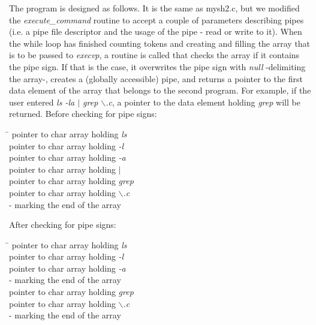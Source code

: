 \documentclass[a4paper,10pt]{article}
\begin{document}
The program is designed as follows. It is the same as mysh2.c, but we modified the \emph{execute\_command} routine to accept a couple of parameters describing pipes (i.e. a pipe file descriptor and the usage of the pipe - read or write to it). When the while loop has finished counting tokens and creating and filling the array that is to be passed to \emph{execvp}, a routine is called that checks the array if it contains the pipe sign. If that is the case, it overwrites the pipe sign with \emph{null} -delimiting the array-, creates a (globally accessible) pipe, and returns a pointer to the first data element of the array that belongs to the second program. For example, if the user entered \emph{ls -la $\mid$ grep $\backslash$.c}, a pointer to the data element holding \emph{grep} will be returned. Before checking for pipe signs:
\begin{tabbing}
\hspace{20pt}\=\kill
 \> [0] pointer to char array holding \emph{ls}\\ 
 \> [1] pointer to char array holding \emph{-l}\\
 \> [2] pointer to char array holding \emph{-a}\\
 \> [3] pointer to char array holding \emph{$\mid$}\\ 
 \> [4] pointer to char array holding \emph{grep}\\
 \> [5] pointer to char array holding \emph{$\backslash$.c}\\
  - marking the end of the array
\end{tabbing}
After checking for pipe signs:
\begin{tabbing}
\hspace{20pt}\=\kill
 \> [0] pointer to char array holding \emph{ls}\\ 
 \> [1] pointer to char array holding \emph{-l}\\
 \> [2] pointer to char array holding \emph{-a}\\
  - marking the end of the array\\ 
 \> [4] pointer to char array holding \emph{grep}\\
 \> [5] pointer to char array holding \emph{$\backslash$.c}\\
  - marking the end of the array
\end{tabbing}
\end{document}
